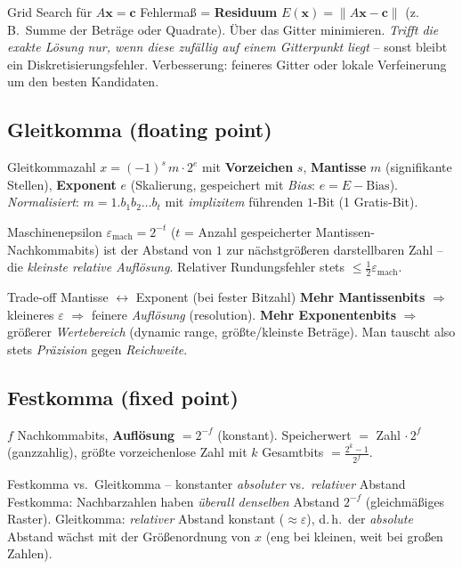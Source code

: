 \documentclass[a4paper,11pt]{article}
\begin{document}
\begin{satz}{Grid Search für $A\mathbf x=\mathbf c$}
Fehlermaß = \textbf{Residuum} $E(\mathbf x)=\lVert A\mathbf x-\mathbf c\rVert$ (z.\,B.\ Summe der
Beträge oder Quadrate). Über das Gitter minimieren. \emph{Trifft die exakte Lösung nur, wenn diese
zufällig auf einem Gitterpunkt liegt} -- sonst bleibt ein Diskretisierungsfehler. Verbesserung:
feineres Gitter oder lokale Verfeinerung um den besten Kandidaten.
\end{satz}

\subsection{Gleitkomma (floating point)}
\begin{defi}{Gleitkommazahl}
$x=(-1)^s\,m\cdot 2^{e}$ mit \textbf{Vorzeichen} $s$, \textbf{Mantisse} $m$ (signifikante Stellen),
\textbf{Exponent} $e$ (Skalierung, gespeichert mit \emph{Bias}: $e=E-\text{Bias}$).
\emph{Normalisiert}: $m=1{.}b_1b_2\dots b_t$ mit \emph{implizitem} führenden $1$-Bit (1 Gratis-Bit).
\end{defi}

\begin{satz}{Maschinenepsilon}
$\varepsilon_{\mathrm{mach}}=2^{-t}$ ($t$ = Anzahl gespeicherter Mantissen-Nachkommabits) ist der
Abstand von $1$ zur nächstgrößeren darstellbaren Zahl -- die \emph{kleinste relative Auflösung}.
Relativer Rundungsfehler stets $\le \tfrac12\varepsilon_{\mathrm{mach}}$.
\end{satz}

\begin{intu}{Trade-off Mantisse $\leftrightarrow$ Exponent (bei fester Bitzahl)}
\textbf{Mehr Mantissenbits} $\Rightarrow$ kleineres $\varepsilon$ $\Rightarrow$ feinere
\emph{Auflösung} (resolution). \textbf{Mehr Exponentenbits} $\Rightarrow$ größerer
\emph{Wertebereich} (dynamic range, größte/kleinste Beträge). Man tauscht also stets
\emph{Präzision} gegen \emph{Reichweite}.
\end{intu}

\subsection{Festkomma (fixed point)}
$f$ Nachkommabits, \textbf{Auflösung} $=2^{-f}$ (konstant). Speicherwert $=$ Zahl$\,\cdot 2^{f}$
(ganzzahlig), größte vorzeichenlose Zahl mit $k$ Gesamtbits $=\frac{2^{k}-1}{2^{f}}$.

\begin{falle}{Festkomma vs.\ Gleitkomma -- konstanter \emph{absoluter} vs.\ \emph{relativer} Abstand}
Festkomma: Nachbarzahlen haben \emph{überall denselben} Abstand $2^{-f}$ (gleichmäßiges Raster).
Gleitkomma: \emph{relativer} Abstand konstant ($\approx\varepsilon$), d.\,h.\ der \emph{absolute}
Abstand wächst mit der Größenordnung von $x$ (eng bei kleinen, weit bei großen Zahlen).
\end{falle}
\end{document}
